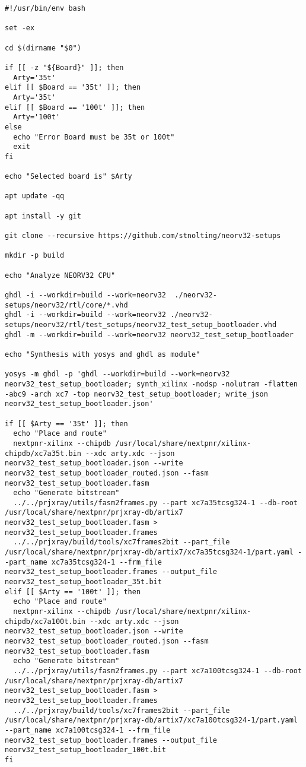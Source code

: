\begin{code}
\begin{verbatim}
#!/usr/bin/env bash

set -ex

cd $(dirname "$0")

if [[ -z "${Board}" ]]; then
  Arty='35t'
elif [[ $Board == '35t' ]]; then
  Arty='35t'
elif [[ $Board == '100t' ]]; then
  Arty='100t'
else
  echo "Error Board must be 35t or 100t"
  exit
fi

echo "Selected board is" $Arty

apt update -qq

apt install -y git

git clone --recursive https://github.com/stnolting/neorv32-setups

mkdir -p build

echo "Analyze NEORV32 CPU"

ghdl -i --workdir=build --work=neorv32  ./neorv32-setups/neorv32/rtl/core/*.vhd
ghdl -i --workdir=build --work=neorv32 ./neorv32-setups/neorv32/rtl/test_setups/neorv32_test_setup_bootloader.vhd
ghdl -m --workdir=build --work=neorv32 neorv32_test_setup_bootloader

echo "Synthesis with yosys and ghdl as module"

yosys -m ghdl -p 'ghdl --workdir=build --work=neorv32 neorv32_test_setup_bootloader; synth_xilinx -nodsp -nolutram -flatten -abc9 -arch xc7 -top neorv32_test_setup_bootloader; write_json neorv32_test_setup_bootloader.json' 

if [[ $Arty == '35t' ]]; then
  echo "Place and route"
  nextpnr-xilinx --chipdb /usr/local/share/nextpnr/xilinx-chipdb/xc7a35t.bin --xdc arty.xdc --json neorv32_test_setup_bootloader.json --write neorv32_test_setup_bootloader_routed.json --fasm neorv32_test_setup_bootloader.fasm
  echo "Generate bitstream"
  ../../prjxray/utils/fasm2frames.py --part xc7a35tcsg324-1 --db-root /usr/local/share/nextpnr/prjxray-db/artix7 neorv32_test_setup_bootloader.fasm > neorv32_test_setup_bootloader.frames
  ../../prjxray/build/tools/xc7frames2bit --part_file /usr/local/share/nextpnr/prjxray-db/artix7/xc7a35tcsg324-1/part.yaml --part_name xc7a35tcsg324-1 --frm_file neorv32_test_setup_bootloader.frames --output_file neorv32_test_setup_bootloader_35t.bit
elif [[ $Arty == '100t' ]]; then
  echo "Place and route"
  nextpnr-xilinx --chipdb /usr/local/share/nextpnr/xilinx-chipdb/xc7a100t.bin --xdc arty.xdc --json neorv32_test_setup_bootloader.json --write neorv32_test_setup_bootloader_routed.json --fasm neorv32_test_setup_bootloader.fasm
  echo "Generate bitstream"
  ../../prjxray/utils/fasm2frames.py --part xc7a100tcsg324-1 --db-root /usr/local/share/nextpnr/prjxray-db/artix7 neorv32_test_setup_bootloader.fasm > neorv32_test_setup_bootloader.frames
  ../../prjxray/build/tools/xc7frames2bit --part_file /usr/local/share/nextpnr/prjxray-db/artix7/xc7a100tcsg324-1/part.yaml --part_name xc7a100tcsg324-1 --frm_file neorv32_test_setup_bootloader.frames --output_file neorv32_test_setup_bootloader_100t.bit
fi


\end{verbatim}
\end{code}
